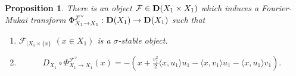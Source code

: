 \documentclass[leqno,11pt]{amsart}
\newtheorem{Prop}[Thm]{Proposition}
\theoremstyle{definition}
\def\FF{\ensuremath{\mathcal F}}
\begin{document}
\begin{Prop}\label{prop:uhl}
There is an object $\FF \in {\bf D}(X_1 \times X_1)$
which induces a Fourier-Mukai transform
$\Phi_{X_1 \to X_1}^{\FF^{\vee}}:{\bf D}(X_1) \to {\bf D}(X_1)$
such that
\begin{enumerate}
\item
$\FF_{|X_1 \times \{ x \}}$ $(x \in X_1)$ is a $\sigma$-stable object.
\item
\begin{equation}
D_{X_1} \circ \Phi_{X_1 \to X_1}^{\FF^{\vee}}(x)
=-(x+\tfrac{v_1^2}{2} \langle x,u_1 \rangle u_1-\langle x,v_1 \rangle u_1-
\langle x,u_1 \rangle v_1).
\end{equation}
\end{enumerate} 
\end{Prop}
\end{document}
